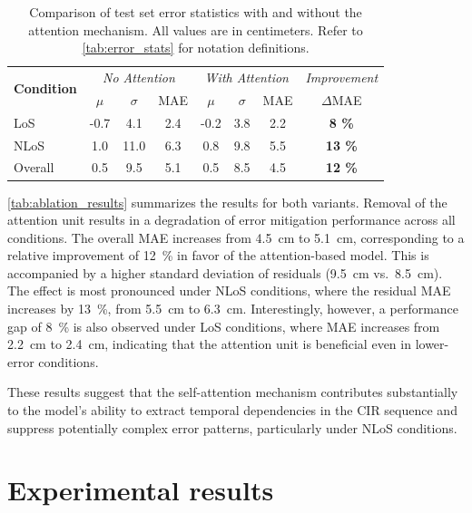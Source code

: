 \begin{table}[tbh]
\centering
\caption[Error statistics with and without the attention mechanism.]{Comparison of test set error statistics with and without the attention mechanism. All values are in centimeters. Refer to \autoref{tab:error_stats} for notation definitions.}
\label{tab:ablation_results}
\begin{tabular}{lccc|ccc|c}
\toprule
\multirow{2}{*}{\textbf{Condition}} &
\multicolumn{3}{c|}{\textit{No Attention}} &
\multicolumn{3}{c|}{\textit{With Attention}} &
\textit{Improvement} \\
& $\mu$ & $\sigma$ & MAE & $\mu$ & $\sigma$ & MAE & $\Delta$MAE \\
\midrule
LoS     & -0.7 & 4.1  & 2.4 & -0.2 & 3.8 & 2.2 & \textbf{8 \%} \\
NLoS    & 1.0  & 11.0 & 6.3 & 0.8  & 9.8 & 5.5 & \textbf{13 \%} \\
Overall & 0.5  & 9.5  & 5.1 & 0.5  & 8.5 & 4.5 & \textbf{12 \%} \\
\bottomrule
\end{tabular}
\end{table}

\autoref{tab:ablation_results} summarizes the results for both variants. Removal of the attention unit results in a degradation of error mitigation performance across all conditions. The overall MAE increases from \SI{4.5}{\centi\metre} to \SI{5.1}{\centi\metre}, corresponding to a relative improvement of \SI{12}{\percent} in favor of the attention-based model. This is accompanied by a higher standard deviation of residuals (\SI{9.5}{\centi\metre} vs.\ \SI{8.5}{\centi\metre}). The effect is most pronounced under NLoS conditions, where the residual MAE increases by \SI{13}{\percent}, from \SI{5.5}{\centi\metre} to \SI{6.3}{\centi\metre}. Interestingly, however, a performance gap of \SI{8}{\percent} is also observed under LoS conditions, where MAE increases from \SI{2.2}{\centi\metre} to \SI{2.4}{\centi\metre}, indicating that the attention unit is beneficial even in lower-error conditions.

These results suggest that the self-attention mechanism contributes substantially to the model's ability to extract temporal dependencies in the CIR sequence and suppress potentially complex error patterns, particularly under NLoS conditions.


\section{Experimental results}

